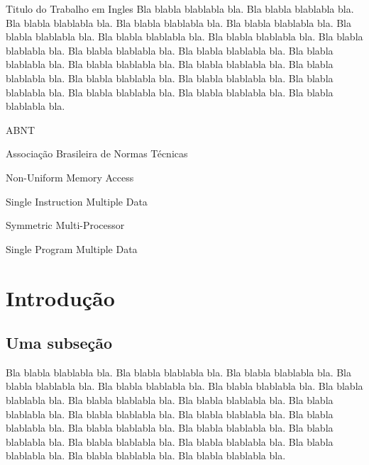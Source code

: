 \documentclass[tese,capa]{texufpel}
\begin{document}
\begin{englishabstract}{Titulo do Trabalho em Ingles}
Bla blabla blablabla bla.  Bla blabla blablabla bla.  Bla blabla
blablabla bla.  Bla blabla blablabla bla.  Bla blabla blablabla bla.
Bla blabla blablabla bla.  Bla blabla blablabla bla.  Bla blabla
blablabla bla.  Bla blabla blablabla bla.  Bla blabla blablabla bla.
Bla blabla blablabla bla.  Bla blabla blablabla bla.  Bla blabla
blablabla bla.  Bla blabla blablabla bla.  Bla blabla blablabla bla.
Bla blabla blablabla bla.  Bla blabla blablabla bla.  Bla blabla
blablabla bla.  Bla blabla blablabla bla.  Bla blabla blablabla bla.
Bla blabla blablabla bla.
\end{englishabstract}

\listoffigures

\listoftables

\begin{listofabbrv}{ABNT}%
        \item[ABNT] Associação Brasileira de Normas Técnicas
        \item[NUMA] Non-Uniform Memory Access
        \item[SIMD] Single Instruction Multiple Data
        \item[SMP] Symmetric Multi-Processor
        \item[SPMD] Single Program Multiple Data
\end{listofabbrv}

\tableofcontents

\chapter{Introdução}

\section{Uma subseção}
Bla blabla blablabla bla.  Bla blabla blablabla bla.  Bla blabla
blablabla bla.  Bla blabla blablabla bla.  Bla blabla blablabla bla.
Bla blabla blablabla bla.  Bla blabla blablabla bla.  Bla blabla
blablabla bla.  Bla blabla blablabla bla.  Bla blabla blablabla bla.
Bla blabla blablabla bla.  Bla blabla blablabla bla.  Bla blabla
blablabla bla.  Bla blabla blablabla bla.  Bla blabla blablabla bla.
Bla blabla blablabla bla.  Bla blabla blablabla bla.  Bla blabla
blablabla bla.  Bla blabla blablabla bla.  Bla blabla blablabla bla.
Bla blabla blablabla bla.
\end{document}
